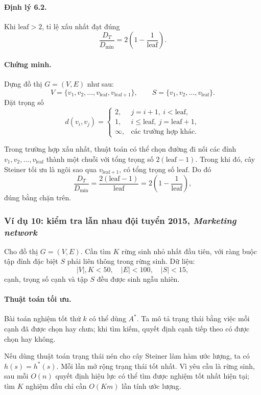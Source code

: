\documentclass[11pt]{article}
\begin{document}
\paragraph{Định lý 6.2.}
Khi \(\mathrm{leaf}>2\), tỉ lệ xấu nhất đạt đúng
\[
  \frac{D_T}{D_{\min}}=
  2\left(1-\frac1{\mathrm{leaf}}\right).
\]

\paragraph{Chứng minh.}
Dựng đồ thị \(G=(V,E)\) như sau:
\[
  V=\{v_1,v_2,\ldots,v_{\mathrm{leaf}},v_{\mathrm{leaf}+1}\},
  \qquad
  S=\{v_1,v_2,\ldots,v_{\mathrm{leaf}}\}.
\]
Đặt trọng số
\[
d(v_i,v_j)=
\begin{cases}
2, & j=i+1,\ i<\mathrm{leaf},\\
1, & i\le \mathrm{leaf},\ j=\mathrm{leaf}+1,\\
\infty, & \text{các trường hợp khác.}
\end{cases}
\]

Trong trường hợp xấu nhất, thuật toán có thể chọn đường đi nối các đỉnh
\(v_1,v_2,\ldots,v_{\mathrm{leaf}}\) thành một chuỗi với tổng trọng số
\(2(\mathrm{leaf}-1)\). Trong khi đó, cây Steiner tối ưu là ngôi sao qua
\(v_{\mathrm{leaf}+1}\), có tổng trọng số \(\mathrm{leaf}\). Do đó
\[
  \frac{D_T}{D_{\min}}
  =\frac{2(\mathrm{leaf}-1)}{\mathrm{leaf}}
  =2\left(1-\frac1{\mathrm{leaf}}\right),
\]
đúng bằng chặn trên.

\subsubsection{Ví dụ 10: kiểm tra lẫn nhau đội tuyển 2015, \emph{Marketing network}}

Cho đồ thị \(G=(V,E)\). Cần tìm \(K\) rừng sinh nhỏ nhất đầu tiên, với ràng buộc
tập đỉnh đặc biệt \(S\) phải liên thông trong rừng sinh. Dữ liệu:
\[
  |V|,K<50,\quad |E|<100,\quad |S|<15,
\]
cạnh, trọng số cạnh và tập \(S\) đều được sinh ngẫu nhiên.

\paragraph{Thuật toán tối ưu.}
Bài toán nghiệm tốt thứ \(k\) có thể dùng \(A^*\). Ta mô tả trạng thái bằng việc
mỗi cạnh đã được chọn hay chưa; khi tìm kiếm, quyết định cạnh tiếp theo có được
chọn hay không.

Nếu dùng thuật toán trạng thái nén cho cây Steiner làm hàm ước lượng, ta có
\(h(s)=h^*(s)\). Mỗi lần mở rộng trạng thái tốt nhất. Vì yêu cầu là rừng sinh,
sau mỗi \(O(n)\) quyết định hiệu lực có thể tìm được nghiệm tốt nhất hiện tại;
tìm \(K\) nghiệm đầu chỉ cần \(O(Km)\) lần tính ước lượng.
\end{document}

